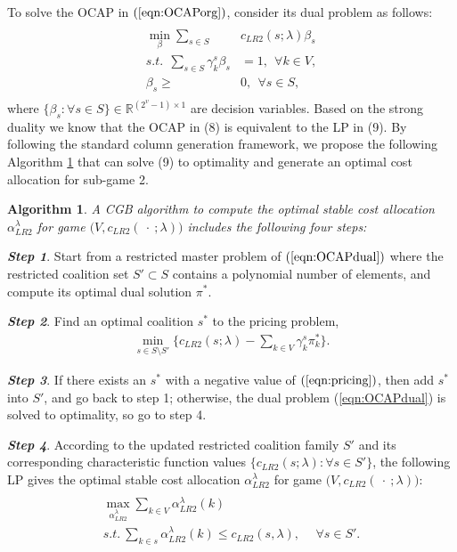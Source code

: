 \documentclass[ijoc,nonblindrev]{informs3} %
\newtheorem{algorithm}{Algorithm}
\newcommand{\R}{\mathbb{R}}
\begin{document}
To solve the OCAP in $(\ref{eqn:OCAPorg})$, consider its dual problem as follows:
\begin{eqnarray}\label{eqn:OCAPdual}
\begin{aligned}
\begin{split}
\min_{\beta} \sum_{s \in S} &c_{LR2}(s;\lambda)\beta_{s}\\
s.t.~~\sum_{s \in S} \gamma^s_k\beta_{s}& = 1,~~\forall k \in V,\\
\beta_{s} \geq &0, ~~\forall s \in S,
\end{split}
\end{aligned}
\end{eqnarray}
where $\{\beta_s:\forall s\in S \} \in \R^{(2^v-1) \times 1}$ are decision variables.
Based on the strong duality we know that the OCAP in (8) is equivalent to the LP in (9). By following the standard column generation framework, we propose the following Algorithm \ref{alg1} that can solve (9) to optimality and generate an optimal cost allocation for sub-game 2.

\begin{algorithm}\label{alg1}
A CGB algorithm to compute the optimal stable cost allocation $\alpha_{LR2}^{\lambda}$ for game $\big(V,c_{LR2}(\ \cdot\ ;\lambda)\big)$ includes  the following four steps:
\end{algorithm}

\textbf{\em Step 1}. Start from a restricted master problem of $(\ref{eqn:OCAPdual})$ where the restricted coalition set $S' \subset S$ contains a polynomial number of elements, and compute its optimal dual solution $\pi^{*}$.

\textbf{\em Step 2}. Find an optimal coalition $s^*$  to the pricing problem,
\begin{eqnarray}\label{eqn:pricing}
\min_{s\in S\setminus S'}  \big\{c_{LR2}(s;\lambda) - \sum_{ k \in V} \gamma^s_k \pi_{k}^{*}\big\}.
\end{eqnarray}

\textbf{\em Step 3}. If there exists an $s^*$  with a negative value of  $(\ref{eqn:pricing})$, then add $s^*$ into $S'$, and go back to step 1; otherwise, the dual problem (\ref{eqn:OCAPdual}) is solved to optimality, so go to step 4.

\textbf{\em Step 4}. According to the updated restricted coalition family $S'$ and its corresponding characteristic function values $\{c_{LR2}(s;\lambda):\forall s \in S' \}$, the following LP gives the optimal stable cost allocation $\alpha_{LR2}^{\lambda}$ for game $\big(V, c_{LR2}(\ \cdot\ ;\lambda)\big)$:
\begin{eqnarray*}\label{eqn:alpha2}
\begin{aligned}
\begin{split}
\max_{\alpha_{LR2}^{\lambda}} \sum_{k \in  V} \alpha_{LR2}^{\lambda}(k)~~&\\
s.t.~\sum_{k \in s} \alpha_{LR2}^{\lambda}(k) \leq  c_{LR2}(s,\lambda),&~~\forall s \in S'.
\end{split}
\end{aligned}
\end{eqnarray*}
\end{document}
